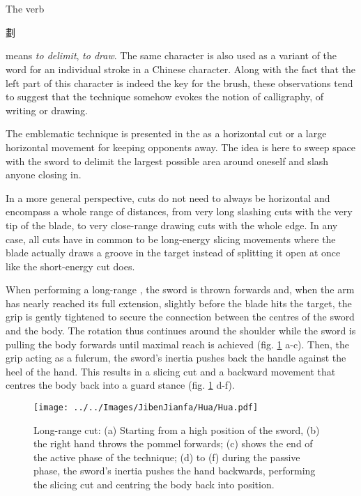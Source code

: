 \section{\Hua}
The verb \Hua{} \begin{CJK*}{UTF8}{bsmi}劃\end{CJK*} means \textit{to delimit}, \textit{to draw}. The same character is also used as a variant of the word for an individual stroke in a Chinese character. 
Along with the fact that the left part of this character is indeed the key for the brush, these observations tend to suggest that the technique somehow evokes the notion of calligraphy, of writing or drawing. 

The emblematic technique is presented in the \Yangjia{} \Michuan{} as a horizontal cut or a large horizontal movement for keeping opponents away. The idea is here to sweep space with the sword to delimit the largest possible area around oneself and slash anyone closing in. 

In a more general perspective, \Hua{} cuts do not need to always be horizontal and encompass a whole range of distances, from very long slashing cuts with the very tip of the blade, to very close-range drawing cuts with the whole edge. In any case, all \Hua{} cuts have in common to be long-energy slicing movements where the blade actually draws a groove in the target instead of splitting it open at once like the short-energy \Pi{} cut does. 

When performing a long-range \Hua{}, the sword is thrown forwards and, when the arm has nearly reached its full extension, slightly before the blade hits the target, the grip is gently tightened to secure the connection between the centres of the sword and the body. The rotation thus continues around the shoulder while the sword is pulling the body forwards until maximal reach is achieved (fig. \ref{fig:hua_cut} a-c). Then, the grip acting as a fulcrum, the sword's inertia pushes back the handle against the heel of the hand. This results in a slicing cut and a backward movement that centres the body back into a guard stance (fig. \ref{fig:hua_cut} d-f).

\begin{figure}[ht]
\centering
	\texttt{[image: ../../Images/JibenJianfa/Hua/Hua.pdf]}
	\caption[Long-range \Hua{} cut]{Long-range \Hua{} cut: (a) Starting from a high position of the sword, (b) the right hand throws the pommel forwards; (c) shows the end of the active phase of the technique; (d) to (f) during the passive phase, the sword's inertia pushes the hand backwards, performing the slicing cut and centring the body back into position.}
	\label{fig:hua_cut}
\end{figure}


